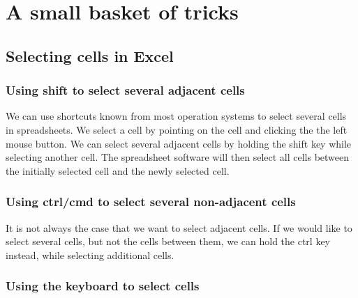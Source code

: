 \documentclass[]{book}
\begin{document}
\hypertarget{a-small-basket-of-tricks}{%
\section{A small basket of tricks}\label{a-small-basket-of-tricks}}

\hypertarget{selecting-cells-in-excel}{%
\subsection{Selecting cells in Excel}\label{selecting-cells-in-excel}}

\hypertarget{using-shift-to-select-several-adjacent-cells}{%
\subsubsection*{Using shift to select several adjacent cells}\label{using-shift-to-select-several-adjacent-cells}}

We can use shortcuts known from most operation systems to select several cells in spreadsheets. We select a cell by pointing on the cell and clicking the the left mouse button. We can select several adjacent cells by holding the shift key while selecting another cell. The spreadsheet software will then select all cells between the initially selected cell and the newly selected cell.

\hypertarget{using-ctrlcmd-to-select-several-non-adjacent-cells}{%
\subsubsection*{Using ctrl/cmd to select several non-adjacent cells}\label{using-ctrlcmd-to-select-several-non-adjacent-cells}}

It is not always the case that we want to select adjacent cells. If we would like to select several cells, but not the cells between them, we can hold the ctrl key instead, while selecting additional cells.

\hypertarget{using-the-keyboard-to-select-cells}{%
\subsubsection*{Using the keyboard to select cells}\label{using-the-keyboard-to-select-cells}}
\end{document}
